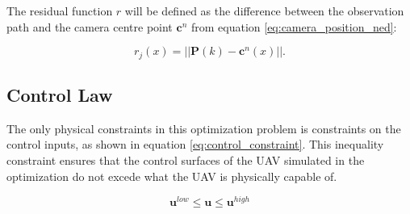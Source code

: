 The residual function $r$ will be defined as the difference between the observation path and the camera centre point $\mathbf{c}^n$ from equation \ref{eq:camera_position_ned}:

\begin{equation}
	r_j(x) = ||\mathbf{P}(k) - \mathbf{c}^n(x)||.
\end{equation} 


\subsection{Control Law}

The only physical constraints in this optimization problem is constraints on the control inputs, as shown in equation \ref{eq:control_constraint}. This inequality constraint ensures that the control surfaces of the UAV simulated in the optimization do not excede what the UAV is physically capable of.

\begin{equation}
	\label{eq:control_constraint}
	\mathbf{u}^{low} \leq \mathbf{u} \leq \mathbf{u}^{high}
\end{equation}
